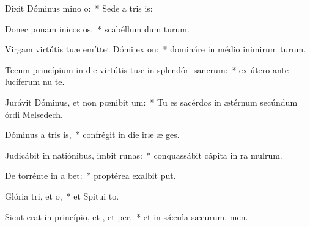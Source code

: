 \item Dixit Dóminus mino o:~* Sede a tris is:
\item Donec ponam inicos os,~* scabéllum dum turum.
\item Virgam virtútis tuæ emíttet Dómi ex on:~* domináre in médio inimirum turum.
\item Tecum princípium in die virtútis tuæ in splendóri sancrum:~* ex útero ante lucíferum nu te.
\item Jurávit Dóminus, et non pœnibit um:~* Tu es sacérdos in ætérnum secúndum órdi Melsedech.
\item Dóminus a tris is,~* confrégit in die iræ æ ges.
\item Judicábit in natiónibus, imbit runas:~* conquassábit cápita in ra mulrum.
\item De torrénte in a bet:~* proptérea exalbit put.
\item Glória tri, et o,~* et Spitui to.
\item Sicut erat in princípio, et , et per,~* et in sǽcula sæcurum. men.

